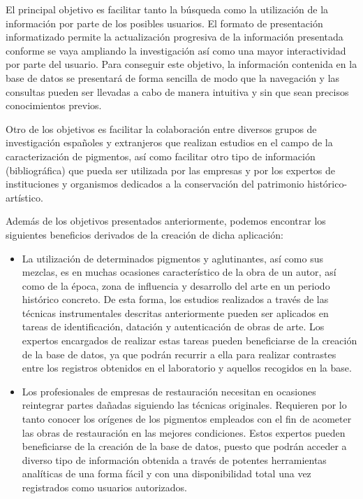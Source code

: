El principal objetivo es facilitar tanto la búsqueda como la utilización de la información por parte de los posibles usuarios. El formato de presentación informatizado permite la actualización progresiva de la información presentada conforme se vaya ampliando la investigación así como una mayor interactividad por parte del usuario. Para conseguir este objetivo, la información contenida en la base de datos se presentará de forma sencilla de modo que la navegación y las consultas pueden ser llevadas a cabo de manera intuitiva y sin que sean precisos conocimientos previos.

Otro de los objetivos es facilitar la colaboración entre diversos grupos de investigación españoles y extranjeros que realizan estudios en el campo de la caracterización de pigmentos, así como facilitar otro tipo de información (bibliográfica) que pueda ser utilizada por las empresas y por los expertos de instituciones y organismos dedicados a la conservación del patrimonio histórico-artístico.

Además de los objetivos presentados anteriormente, podemos encontrar los siguientes beneficios derivados de la creación de dicha aplicación: 

\begin{itemize}
    \item La utilización de determinados pigmentos y aglutinantes, así como sus mezclas, es en muchas ocasiones característico de la obra de un autor, así como de la época, zona de influencia y desarrollo del arte en un periodo histórico concreto. De esta forma, los estudios realizados a través de las técnicas instrumentales descritas anteriormente pueden ser aplicados en tareas de identificación, datación y autenticación de obras de arte. Los expertos encargados de realizar estas tareas pueden beneficiarse de la creación de la base de datos, ya que podrán recurrir a ella para realizar contrastes entre los registros obtenidos en el laboratorio y aquellos recogidos en la base.
    \item Los profesionales de empresas de restauración necesitan en ocasiones reintegrar partes dañadas siguiendo las técnicas originales. Requieren por lo tanto conocer los orígenes de los pigmentos empleados con el fin de acometer las obras de restauración en las mejores condiciones. Estos expertos pueden beneficiarse de la creación de la base de datos, puesto que podrán acceder a diverso tipo de información obtenida a través de potentes herramientas analíticas de una forma fácil y con una disponibilidad total una vez registrados como usuarios autorizados.
\end{itemize}